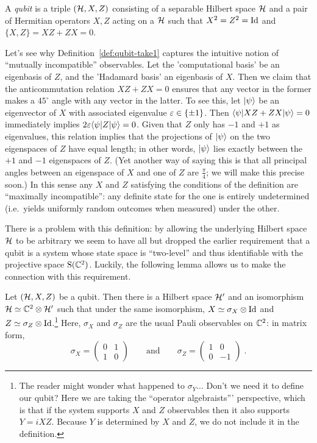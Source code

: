 \begin{definition}\label{def:qubit-take1}
A \emph{qubit} is a triple $(\mathcal{H},X,Z)$ consisting of a separable Hilbert space $\mathcal{H}$ and a pair of Hermitian operators $X,Z$ acting on a $\mathcal{H}$ such that $X^2=Z^2=\mathop{\rm Id}\nolimits$ and $\{X,Z\}=XZ+ZX=0$.
\end{definition}

Let's see why 
Definition~\ref{def:qubit-take1} captures the intuitive notion of ``mutually incompatible'' observables. Let the 'computational basis' be an eigenbasis of $Z$, and the 'Hadamard basis' an eigenbasis of $X$. Then we claim that the anticommutation relation $XZ+ZX=0$ ensures that any vector in the former makes a $45^{\circ}$ angle with any vector in the latter. To see this, let $|\psi\rangle$ be an eigenvector of $X$ with associated eigenvalue $\varepsilon\in\{\pm 1\}$. Then $\langle\psi| XZ + ZX |\psi\rangle = 0$ immediately implies $2\varepsilon\langle\psi| Z |\psi\rangle=0$. Given that $Z$ only has $-1$ and $+1$ as eigenvalues, this relation implies that the projections of $|\psi\rangle$ on the two eigenspaces of $Z$ have equal length; in other words, $|\psi\rangle$ lies exactly between the $+1$ and $-1$ eigenspaces of $Z$. (Yet another way of saying this is that all principal angles between an eigenspace of $X$ and one of $Z$ are $\frac{\pi}{4}$; we will make this precise soon.) In this sense any $X$ and $Z$ satisfying the conditions of the definition are ``maximally incompatible'': any definite state for the one is entirely undetermined (i.e.\ yields uniformly random outcomes when measured) under the other. 

There is a problem with this definition: by allowing the underlying Hilbert space $\mathcal{H}$ to be arbitrary we seem to have all but dropped the earlier requirement that a qubit is a system whose state space is ``two-level'' and thus identifiable with the projective space $\mathrm{S}(\mathbb{C}^2)$. Luckily, the following lemma allows us to make the connection with this requirement. 

\begin{lemma}\label{lem:qubit-c2}
Let $(\mathcal{H},X,Z)$ be a qubit. Then there is a Hilbert space $\mathcal{H}'$ and an isomorphism $\mathcal{H}\simeq \mathbb{C}^2 \otimes \mathcal{H}'$ such that under the same isomorphism, $X\simeq \sigma_X\otimes \mathop{\rm Id}\nolimits$ and $Z\simeq \sigma_Z \otimes \mathop{\rm Id}\nolimits$.\footnote{The reader might wonder what happened to $\sigma_Y$... Don't we need it to define our qubit? Here we are taking the ``operator algebraists''' perspective, which is that if the system supports $X$ and $Z$ observables then it also supports $Y=iXZ$. Because $Y$ is determined by $X$ and $Z$, we do not include it in the definition.} Here, $\sigma_X$ and $\sigma_Z$ are the usual Pauli observables on $\mathbb{C}^2$: in matrix form, 
\[ \sigma_X = \begin{pmatrix} 0 & 1 \\ 1 & 0 \end{pmatrix} \qquad\text{and}\qquad\sigma_Z = \begin{pmatrix} 1 & 0 \\ 0 & -1 \end{pmatrix}\;.\]
\end{lemma}

